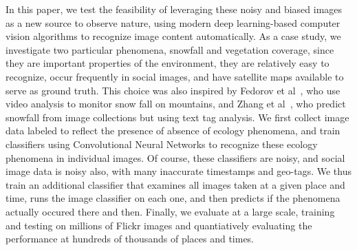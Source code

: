 In this paper, we test the feasibility of leveraging these noisy and
biased images as a new source to observe nature, using modern deep
learning-based computer vision algorithms to recognize image content
automatically.  As a case study, we investigate two particular
phenomena, snowfall and vegetation coverage, since they are important
properties of the environment, they are relatively easy to recognize,
occur frequently in social images, and have satellite maps available
to serve as ground truth. This choice was also inspired by Fedorov et
al~\cite{fedorov2015snowwatch,fedorov2014snow}, who use video analysis
to monitor snow fall on mountains, and Zhang et
al~\cite{ecology2012www}, who predict snowfall from image collections
but using text tag analysis.  We first collect image data labeled to
reflect the presence of absence of ecology phenomena, and train
classifiers using Convolutional Neural Networks to recognize these
ecology phenomena in individual images. Of course, these classifiers
are noisy, and social image data is noisy also, with many inaccurate
timestamps and geo-tags.  We thus train an additional classifier that
examines all images taken at a given place and time, runs the image
classifier on each one, and then predicts if the phenomena actually
occured there and then.  Finally, we evaluate at a large scale,
training and testing on millions of Flickr images and quantiatively
evaluating the performance at hundreds of thousands of places and
times.











